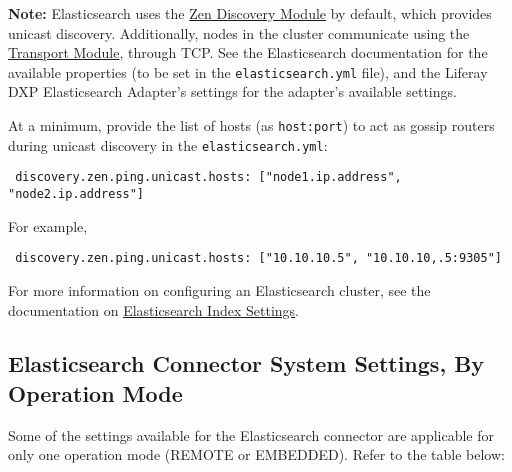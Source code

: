 \noindent\hrulefill

\textbf{Note:} Elasticsearch uses the
\href{https://www.elastic.co/guide/en/elasticsearch/reference/6.5/modules-discovery-zen.html}{Zen
Discovery Module} by default, which provides unicast discovery.
Additionally, nodes in the cluster communicate using the
\href{https://www.elastic.co/guide/en/elasticsearch/reference/6.5/modules-transport.html}{Transport
Module}, through TCP. See the Elasticsearch documentation for the
available properties (to be set in the \texttt{elasticsearch.yml} file),
and the Liferay DXP Elasticsearch Adapter's settings for the adapter's
available settings.

At a minimum, provide the list of hosts (as \texttt{host:port}) to act
as gossip routers during unicast discovery in the
\texttt{elasticsearch.yml}:

\begin{verbatim}
 discovery.zen.ping.unicast.hosts: ["node1.ip.address", "node2.ip.address"]
\end{verbatim}

For example,

\begin{verbatim}
 discovery.zen.ping.unicast.hosts: ["10.10.10.5", "10.10.10,.5:9305"]
\end{verbatim}

\noindent\hrulefill

For more information on configuring an Elasticsearch cluster, see the
documentation on
\href{https://www.elastic.co/guide/en/elasticsearch/guide/current/_index_settings.html}{Elasticsearch
Index Settings}.

\subsection{Elasticsearch Connector System Settings, By Operation
Mode}\label{elasticsearch-connector-system-settings-by-operation-mode}

Some of the settings available for the Elasticsearch connector are
applicable for only one operation mode (REMOTE or EMBEDDED). Refer to
the table below:

